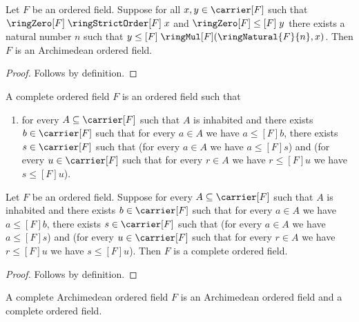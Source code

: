 \begin{proposition}\label{archimedean_ordered_field_intro}
    Let $F$ be an ordered field.
    Suppose for all $x,y\in\carrier[F]$ such that
        $\ringZero[F]\mathrel{\ringStrictOrder[F]}x$ and
        $\ringZero[F]\mathrel{\leq[F]}y$
        there exists a natural number $n$ such that
        $y\mathrel{\leq[F]}\ringMul[F](\ringNatural{F}{n},x)$.
    Then $F$ is an Archimedean ordered field.
\end{proposition}
\begin{proof}
    Follows by definition.
\end{proof}

\begin{struct}\label{complete_ordered_field}
    A complete ordered field $F$ is an ordered field such that
    \begin{enumerate}
        \item\label{complete_ordered_field_law}
            for every $A\subseteq\carrier[F]$ such that $A$ is inhabited
            and there exists $b\in\carrier[F]$ such that for every $a\in A$
            we have $a\mathrel{\leq[F]}b$, there exists $s\in\carrier[F]$
            such that
            (for every $a\in A$ we have $a\mathrel{\leq[F]}s$) and
            (for every $u\in\carrier[F]$ such that for every $r\in A$
                we have $r\mathrel{\leq[F]}u$ we have
                $s\mathrel{\leq[F]}u$).
    \end{enumerate}
\end{struct}

\begin{proposition}\label{complete_ordered_field_intro}
    Let $F$ be an ordered field.
    Suppose for every $A\subseteq\carrier[F]$ such that $A$ is inhabited
        and there exists $b\in\carrier[F]$ such that for every $a\in A$
        we have $a\mathrel{\leq[F]}b$, there exists $s\in\carrier[F]$
        such that
        (for every $a\in A$ we have $a\mathrel{\leq[F]}s$) and
        (for every $u\in\carrier[F]$ such that for every $r\in A$
            we have $r\mathrel{\leq[F]}u$ we have
            $s\mathrel{\leq[F]}u$).
    Then $F$ is a complete ordered field.
\end{proposition}
\begin{proof}
    Follows by definition.
\end{proof}

\begin{struct}\label{complete_archimedean_ordered_field}
    A complete Archimedean ordered field $F$ is an Archimedean ordered field
    and a complete ordered field.
\end{struct}


